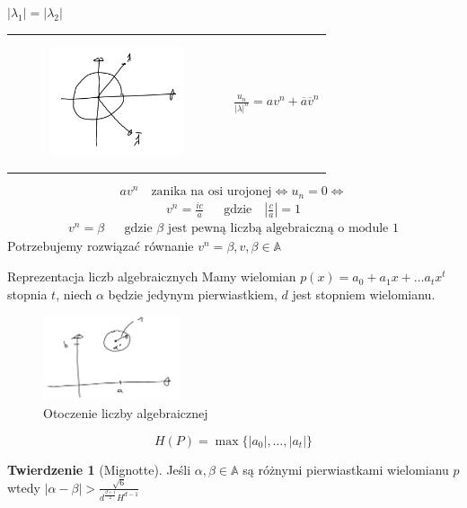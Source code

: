 \documentclass[handout]{beamer}
\def\A{\mathbb{A}}
\theoremstyle{definition}
\newtheorem*{twierdzenie}{Twierdzenie}
\theoremstyle{named}
\begin{document}
\begin{frame}{$|\lambda_1| = |\lambda_2|$}
\begin{table}[]
    \centering
    \begin{tabular}{c c}
       \begin{figure}
            \centering
            \includegraphics[width=40mm]{img/Zaznaczenie_081.png}
        \end{figure}  & 
            $\frac{u_n}{|\lambda|^n} = a v^{n} + \overline{a} \overline{v} ^{n} $
 
    \end{tabular}
\end{table}

\begin{equation*}
    a v^{n} \quad  \text{zanika na osi urojonej} \iff u_n = 0 \iff 
\end{equation*}
\begin{align*}
    v^{n} = \frac{i c}{a} && \text{gdzie} \quad |\frac{c}{a}| = 1
\end{align*}
\begin{align*}
    v^{n} = \beta && \text{gdzie $\beta$ jest pewną liczbą algebraiczną o module 1}
\end{align*}
\pause
Potrzebujemy rozwiązać równanie $v^{n} = \beta, v, \beta \in \A$

\end{frame}

\begin{frame}{Reprezentacja liczb algebraicznych }
    Mamy wielomian $p(x) = a_0 + a_1 x + \ldots a_{t} x^{t}$ stopnia $t$, niech $\alpha$ będzie jedynym pierwiastkiem, $d$ jest stopniem wielomianu.  
    \begin{figure}
        \centering
        \includegraphics[width=40mm]{img/Zaznaczenie_082.png}
        \caption{Otoczenie liczby algebraicznej}
    \end{figure}
    $$H(P) = \max \{ |a_0|, \ldots, |a_t| \}$$
    \begin{twierdzenie}[Mignotte]
            Jeśli $\alpha, \beta \in \A$ są różnymi pierwiastkami wielomianu $p$ wtedy 
            $|\alpha - \beta| > \frac{\sqrt{6}}{d^{\frac{d+1}{2}} H^{d-1}}$
    \end{twierdzenie}
    
\end{frame}
\end{document}
